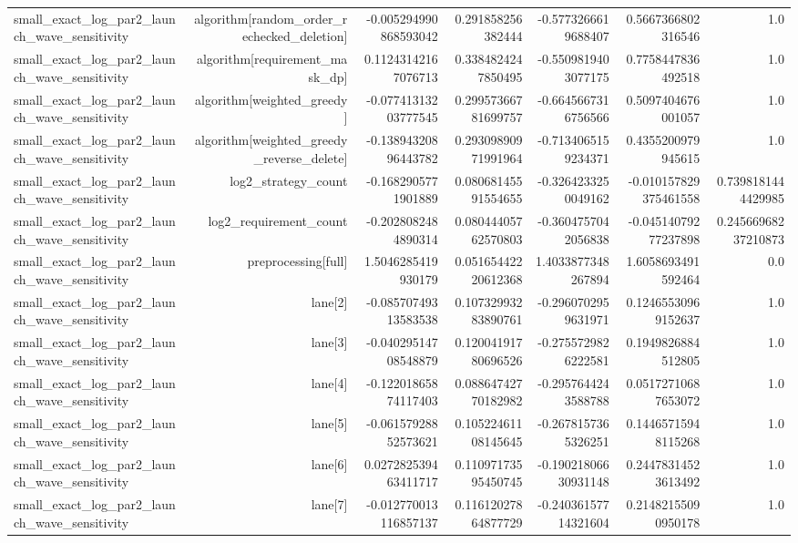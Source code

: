 {\begin{longtable}{lrrrrrr}
small\_exact\_log\_par2\_launch\_wave\_sensitivity & algorithm[random\_order\_rechecked\_deletion] & -0.005294990868593042 & 0.291858256382444 & -0.5773266619688407 & 0.5667366802316546 & 1.0 \\
small\_exact\_log\_par2\_launch\_wave\_sensitivity & algorithm[requirement\_mask\_dp] & 0.11243142167076713 & 0.3384824247850495 & -0.5509819403077175 & 0.7758447836492518 & 1.0 \\
small\_exact\_log\_par2\_launch\_wave\_sensitivity & algorithm[weighted\_greedy] & -0.07741313203777545 & 0.29957366781699757 & -0.6645667316756566 & 0.5097404676001057 & 1.0 \\
small\_exact\_log\_par2\_launch\_wave\_sensitivity & algorithm[weighted\_greedy\_reverse\_delete] & -0.13894320896443782 & 0.29309890971991964 & -0.7134065159234371 & 0.4355200979945615 & 1.0 \\
small\_exact\_log\_par2\_launch\_wave\_sensitivity & log2\_strategy\_count & -0.1682905771901889 & 0.08068145591554655 & -0.3264233250049162 & -0.010157829375461558 & 0.7398181444429985 \\
small\_exact\_log\_par2\_launch\_wave\_sensitivity & log2\_requirement\_count & -0.2028082484890314 & 0.08044405762570803 & -0.3604757042056838 & -0.04514079277237898 & 0.24566968237210873 \\
small\_exact\_log\_par2\_launch\_wave\_sensitivity & preprocessing[full] & 1.5046285419930179 & 0.05165442220612368 & 1.4033877348267894 & 1.6058693491592464 & 0.0 \\
small\_exact\_log\_par2\_launch\_wave\_sensitivity & lane[2] & -0.08570749313583538 & 0.10732993283890761 & -0.2960702959631971 & 0.12465530969152637 & 1.0 \\
small\_exact\_log\_par2\_launch\_wave\_sensitivity & lane[3] & -0.04029514708548879 & 0.12004191780696526 & -0.2755729826222581 & 0.1949826884512805 & 1.0 \\
small\_exact\_log\_par2\_launch\_wave\_sensitivity & lane[4] & -0.12201865874117403 & 0.08864742770182982 & -0.2957644243588788 & 0.05172710687653072 & 1.0 \\
small\_exact\_log\_par2\_launch\_wave\_sensitivity & lane[5] & -0.06157928852573621 & 0.10522461108145645 & -0.2678157365326251 & 0.14465715948115268 & 1.0 \\
small\_exact\_log\_par2\_launch\_wave\_sensitivity & lane[6] & 0.027282539463411717 & 0.11097173595450745 & -0.19021806630931148 & 0.24478314523613492 & 1.0 \\
small\_exact\_log\_par2\_launch\_wave\_sensitivity & lane[7] & -0.012770013116857137 & 0.11612027864877729 & -0.24036157714321604 & 0.21482155090950178 & 1.0 \\

\end{longtable}}

